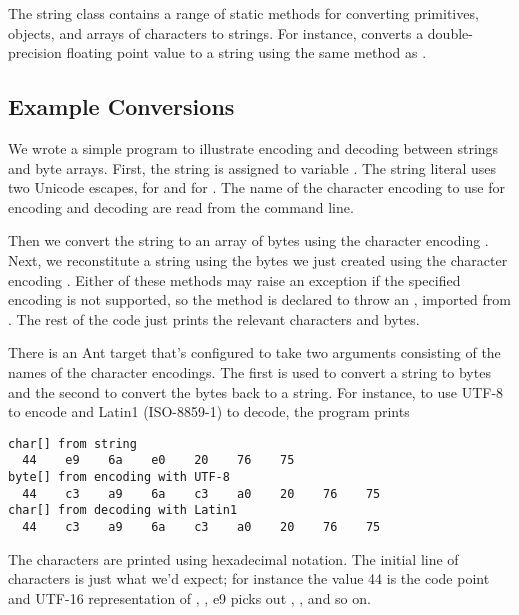 The string class contains a range of static 
methods for converting primitives, objects, and arrays of characters
to strings.  For instance,  converts a
double-precision floating point value to a string using the same
method as .

\subsection{Example Conversions}

We wrote a simple program to illustrate encoding and decoding between
strings and byte arrays.  
%
%
First, the string  is
assigned to variable
.  The string literal uses two Unicode escapes, 
 for  and  for 
.  The name of the character encoding to use for
encoding and decoding are read from the command line.  

Then we convert the string  to an array of bytes
 using the character encoding .  Next, we
reconstitute a string using the bytes we just created using the
character encoding .  Either of these methods may raise
an exception if the specified encoding is not supported, so the 
 method is declared to throw an
, imported from .
The rest of the code just prints the relevant characters and bytes.

There is an Ant target  that's configured to take
two arguments consisting of the names of the character encodings.  The
first is used to convert a string to bytes and the second to convert
the bytes back to a string.  For instance, to use UTF-8 to encode and
Latin1 (ISO-8859-1) to decode, the program prints 
%
\begin{verbatim}
char[] from string
  44    e9    6a    e0    20    76    75
byte[] from encoding with UTF-8
  44    c3    a9    6a    c3    a0    20    76    75
char[] from decoding with Latin1
  44    c3    a9    6a    c3    a0    20    76    75
\end{verbatim}
%
The characters are printed using hexadecimal notation.  The initial
line of characters is just what we'd expect; for instance the
 value 44 is the code point and UTF-16 representation of
, ,  e9
picks out , , and so on.

